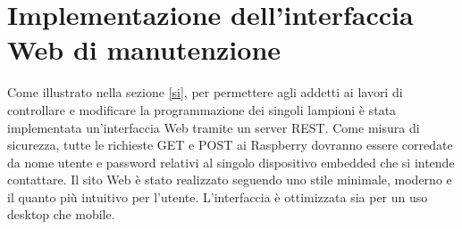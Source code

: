\section{Implementazione dell'interfaccia Web di manutenzione}
Come illustrato nella sezione \ref{si}, per permettere agli addetti ai lavori di controllare e modificare la programmazione dei singoli lampioni è stata implementata un'interfaccia Web tramite un server REST.
Come misura di sicurezza, tutte le richieste GET e POST ai Raspberry dovranno essere corredate da nome utente e password relativi al singolo dispositivo embedded che si intende contattare.
Il sito Web è stato realizzato seguendo uno stile minimale, moderno e il quanto più intuitivo per l'utente.
L'interfaccia è ottimizzata sia per un uso desktop che mobile.
